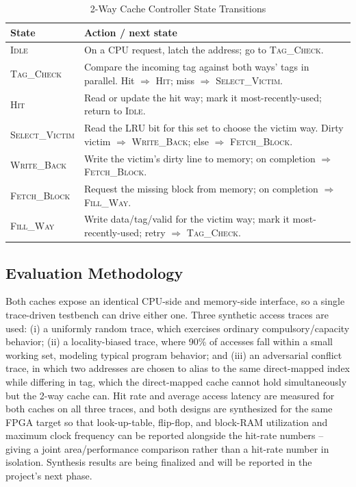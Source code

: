 \documentclass[conference]{IEEEtran}
\begin{document}
\begin{table}[h]
\centering
\caption{2-Way Cache Controller State Transitions}
\label{tab:fsm}
\begin{tabular}{@{}p{2.15cm}p{5.9cm}@{}}
\toprule
\textbf{State} & \textbf{Action / next state} \\
\midrule
\textsc{Idle} & On a CPU request, latch the address; go to \textsc{Tag\_Check}. \\
\textsc{Tag\_Check} & Compare the incoming tag against both ways' tags in parallel. Hit $\Rightarrow$ \textsc{Hit}; miss $\Rightarrow$ \textsc{Select\_Victim}. \\
\textsc{Hit} & Read or update the hit way; mark it most-recently-used; return to \textsc{Idle}. \\
\textsc{Select\_Victim} & Read the LRU bit for this set to choose the victim way. Dirty victim $\Rightarrow$ \textsc{Write\_Back}; else $\Rightarrow$ \textsc{Fetch\_Block}. \\
\textsc{Write\_Back} & Write the victim's dirty line to memory; on completion $\Rightarrow$ \textsc{Fetch\_Block}. \\
\textsc{Fetch\_Block} & Request the missing block from memory; on completion $\Rightarrow$ \textsc{Fill\_Way}. \\
\textsc{Fill\_Way} & Write data/tag/valid for the victim way; mark it most-recently-used; retry $\Rightarrow$ \textsc{Tag\_Check}. \\
\bottomrule
\end{tabular}
\end{table}

\subsection{Evaluation Methodology}
Both caches expose an identical CPU-side and memory-side interface, so a single trace-driven testbench can drive either one. Three synthetic access traces are used: (i) a uniformly random trace, which exercises ordinary compulsory/capacity behavior; (ii) a locality-biased trace, where 90\% of accesses fall within a small working set, modeling typical program behavior; and (iii) an adversarial conflict trace, in which two addresses are chosen to alias to the same direct-mapped index while differing in tag, which the direct-mapped cache cannot hold simultaneously but the 2-way cache can. Hit rate and average access latency are measured for both caches on all three traces, and both designs are synthesized for the same FPGA target so that look-up-table, flip-flop, and block-RAM utilization and maximum clock frequency can be reported alongside the hit-rate numbers -- giving a joint area/performance comparison rather than a hit-rate number in isolation. Synthesis results are being finalized and will be reported in the project's next phase.
\end{document}
